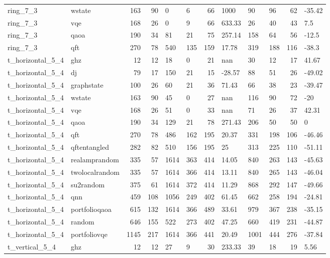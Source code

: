 \begin{longtable}{llrrllrlllrl}
ring\_7\_3 & wstate & 163 & 90 & 0 & 6 & 66 & 1000 & 90 & 96 & 62 & -35.42 \\
ring\_7\_3 & vqe & 168 & 26 & 0 & 9 & 66 & 633.33 & 26 & 40 & 43 & 7.5 \\
ring\_7\_3 & qaoa & 190 & 34 & 81 & 21 & 75 & 257.14 & 158 & 64 & 56 & -12.5 \\
ring\_7\_3 & qft & 270 & 78 & 540 & 135 & 159 & 17.78 & 319 & 188 & 116 & -38.3 \\
t\_horizontal\_5\_4 & ghz & 12 & 12 & 18 & 0 & 21 & nan & 30 & 12 & 17 & 41.67 \\
t\_horizontal\_5\_4 & dj & 79 & 17 & 150 & 21 & 15 & -28.57 & 88 & 51 & 26 & -49.02 \\
t\_horizontal\_5\_4 & graphstate & 100 & 26 & 60 & 21 & 36 & 71.43 & 66 & 38 & 23 & -39.47 \\
t\_horizontal\_5\_4 & wstate & 163 & 90 & 45 & 0 & 27 & nan & 116 & 90 & 72 & -20 \\
t\_horizontal\_5\_4 & vqe & 168 & 26 & 51 & 0 & 33 & nan & 71 & 26 & 37 & 42.31 \\
t\_horizontal\_5\_4 & qaoa & 190 & 34 & 129 & 21 & 78 & 271.43 & 206 & 50 & 50 & 0 \\
t\_horizontal\_5\_4 & qft & 270 & 78 & 486 & 162 & 195 & 20.37 & 331 & 198 & 106 & -46.46 \\
t\_horizontal\_5\_4 & qftentangled & 282 & 82 & 510 & 156 & 195 & 25 & 313 & 225 & 110 & -51.11 \\
t\_horizontal\_5\_4 & realamprandom & 335 & 57 & 1614 & 363 & 414 & 14.05 & 840 & 263 & 143 & -45.63 \\
t\_horizontal\_5\_4 & twolocalrandom & 335 & 57 & 1614 & 366 & 414 & 13.11 & 840 & 265 & 143 & -46.04 \\
t\_horizontal\_5\_4 & su2random & 375 & 61 & 1614 & 372 & 414 & 11.29 & 868 & 292 & 147 & -49.66 \\
t\_horizontal\_5\_4 & qnn & 459 & 108 & 1056 & 249 & 402 & 61.45 & 662 & 258 & 194 & -24.81 \\
t\_horizontal\_5\_4 & portfolioqaoa & 615 & 132 & 1614 & 366 & 489 & 33.61 & 979 & 367 & 238 & -35.15 \\
t\_horizontal\_5\_4 & random & 646 & 155 & 522 & 273 & 402 & 47.25 & 660 & 419 & 231 & -44.87 \\
t\_horizontal\_5\_4 & portfoliovqe & 1145 & 217 & 1614 & 366 & 441 & 20.49 & 1001 & 444 & 276 & -37.84 \\
t\_vertical\_5\_4 & ghz & 12 & 12 & 27 & 9 & 30 & 233.33 & 39 & 18 & 19 & 5.56 \\

\end{longtable}

